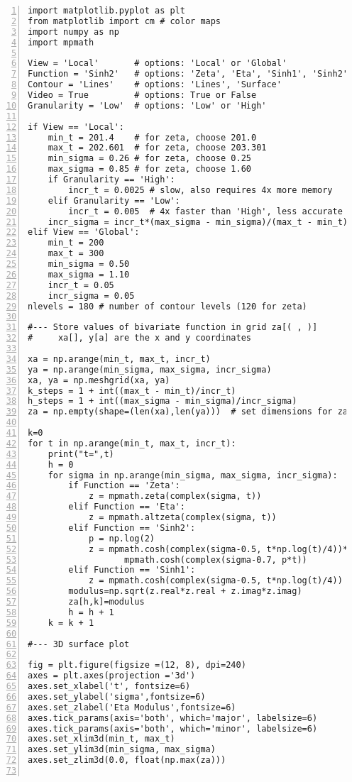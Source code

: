 \documentclass[oneside,10pt]{book}
\begin{document}
\begin{lstlisting}[numbers=left]
import matplotlib.pyplot as plt
from matplotlib import cm # color maps
import numpy as np
import mpmath

View = 'Local'       # options: 'Local' or 'Global'
Function = 'Sinh2'   # options: 'Zeta', 'Eta', 'Sinh1', 'Sinh2'
Contour = 'Lines'    # options: 'Lines', 'Surface'
Video = True         # options: True or False
Granularity = 'Low'  # options: 'Low' or 'High'

if View == 'Local':
    min_t = 201.4    # for zeta, choose 201.0 
    max_t = 202.601  # for zeta, choose 203.301 
    min_sigma = 0.26 # for zeta, choose 0.25 
    max_sigma = 0.85 # for zeta, choose 1.60 
    if Granularity == 'High':
        incr_t = 0.0025 # slow, also requires 4x more memory
    elif Granularity == 'Low':
        incr_t = 0.005  # 4x faster than 'High', less accurate 
    incr_sigma = incr_t*(max_sigma - min_sigma)/(max_t - min_t)    
elif View == 'Global':
    min_t = 200
    max_t = 300
    min_sigma = 0.50
    max_sigma = 1.10
    incr_t = 0.05 
    incr_sigma = 0.05
nlevels = 180 # number of contour levels (120 for zeta)

#--- Store values of bivariate function in grid za[( , )]
#     xa[], y[a] are the x and y coordinates

xa = np.arange(min_t, max_t, incr_t)
ya = np.arange(min_sigma, max_sigma, incr_sigma)
xa, ya = np.meshgrid(xa, ya)
k_steps = 1 + int((max_t - min_t)/incr_t)
h_steps = 1 + int((max_sigma - min_sigma)/incr_sigma)
za = np.empty(shape=(len(xa),len(ya)))  # set dimensions for za

k=0
for t in np.arange(min_t, max_t, incr_t):
    print("t=",t) 
    h = 0
    for sigma in np.arange(min_sigma, max_sigma, incr_sigma):    
        if Function == 'Zeta':
            z = mpmath.zeta(complex(sigma, t)) 
        elif Function == 'Eta':
            z = mpmath.altzeta(complex(sigma, t))
        elif Function == 'Sinh2':
            p = np.log(2)
            z = mpmath.cosh(complex(sigma-0.5, t*np.log(t)/4))* \
                   mpmath.cosh(complex(sigma-0.7, p*t)) 
        elif Function == 'Sinh1':
            z = mpmath.cosh(complex(sigma-0.5, t*np.log(t)/4))
        modulus=np.sqrt(z.real*z.real + z.imag*z.imag)
        za[h,k]=modulus
        h = h + 1
    k = k + 1

#--- 3D surface plot 

fig = plt.figure(figsize =(12, 8), dpi=240)
axes = plt.axes(projection ='3d')
axes.set_xlabel('t', fontsize=6)
axes.set_ylabel('sigma',fontsize=6)
axes.set_zlabel('Eta Modulus',fontsize=6)
axes.tick_params(axis='both', which='major', labelsize=6)
axes.tick_params(axis='both', which='minor', labelsize=6)
axes.set_xlim3d(min_t, max_t)
axes.set_ylim3d(min_sigma, max_sigma)
axes.set_zlim3d(0.0, float(np.max(za)))


\end{lstlisting}
\end{document}
